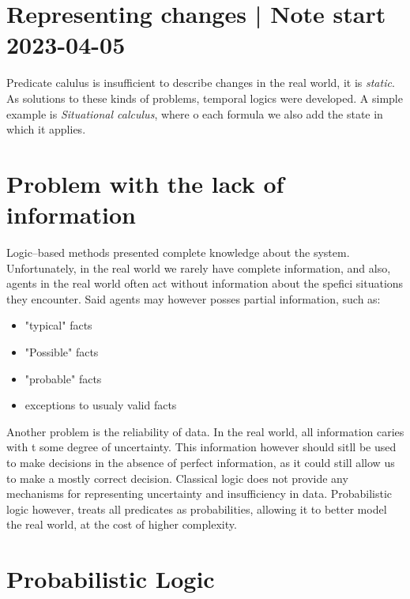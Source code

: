 
\chapter{Representing changes | Note start 2023-04-05}
    Predicate calulus is insufficient to describe changes in the real world,
    it is \textit{static}. As solutions to these kinds of problems, temporal logics were developed. A simple example is \textit{Situational calculus}, where o each formula we also add the state in which it applies.
\chapter{Problem with the lack of information}
Logic--based methods presented complete knowledge about the system. Unfortunately, in the real world we rarely have complete information, and also, agents in the real world often act without information about the spefici situations they encounter. Said agents may however posses partial information, such as:
\begin{itemize}
        \item "typical" facts
        \item "Possible" facts
        \item "probable" facts 
        \item exceptions to usualy valid facts

\end{itemize}
Another problem is the reliability of data. In the real world, all information caries with t some degree of uncertainty. This information however should sitll be used to make decisions in the absence of perfect information, as it could still allow us to make a mostly correct decision.
{
    Classical logic does not provide any mechanisms for representing uncertainty and insufficiency in data. Probabilistic logic however, treats all predicates as probabilities, allowing it to better model the real world, at the cost of higher complexity.
}

\chapter{Probabilistic Logic}
